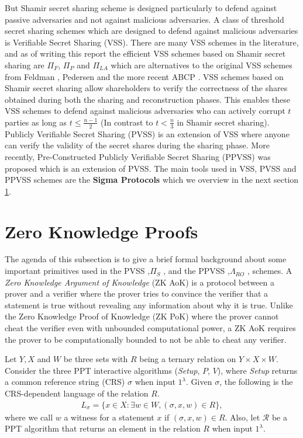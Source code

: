 But Shamir secret sharing scheme is designed particularly to defend against passive adversaries and not 
against malicious adversaries. A class of threshold secret sharing schemes which are designed to defend 
against malicious adversaries is Verifiable Secret Sharing (VSS). There are many VSS schemes in the literature, 
and as of writing this report the efficient VSS schemes based on Shamir secret sharing are $\Pi_F$, 
$\Pi_P$ and $\Pi_{LA}$ \cite{cryptoeprint:2023/1669} which are alternatives to the original VSS schemes 
from Feldman \cite{DBLP:conf/focs/Feldman87}, Pedersen \cite{crypto-1991-1671} and the more recent 
ABCP \cite{cryptoeprint:2023/992}. VSS schemes based on Shamir secret sharing allow shareholders to 
verify the correctness of the shares obtained during both the sharing and reconstruction phases. This enables 
these VSS schemes to defend against malicious adversaries who can actively corrupt $t$ parties as long as 
$t\leq\frac{n-1}{2}$ (In contrast to $t<\frac{n}{3}$ in Shamir secret sharing). Publicly Verifiable Secret Sharing (PVSS) is an extension of VSS where anyone can 
verify the validity of the secret shares during the sharing phase. More recently, Pre-Constructed Publicly 
Verifiable Secret Sharing (PPVSS)\cite{cryptoeprint:2025/576} was proposed which is an extension of PVSS. 
The main tools used in VSS, PVSS and PPVSS schemes are the \textbf{Sigma Protocols} which we overview in the 
next section \ref{sec:sigma-protocols}.

\section{Zero Knowledge Proofs}
\label{sec:sigma-protocols}
The agenda of this subsection is to give a brief formal background about some important primitives 
used in the PVSS ,$\Pi_S$ \cite{cryptoeprint:2023/1669}, and the PPVSS ,$\Lambda_{RO}$ \cite{cryptoeprint:2025/576}, schemes. 
A \textit{Zero Knowledge Argument of Knowledge} (ZK AoK)\cite{cryptoeprint:2017/1066} is a protocol between a prover and a verifier
where the prover tries to convince the verifier that a statement is true without revealing any information 
about why it is true. Unlike the Zero Knowledge Proof of Knowledge (ZK PoK) where the prover cannot cheat 
the verifier even with unbounded computational power, a ZK AoK requires the prover to be computationally bounded 
to not be able to cheat any verifier.\par
Let $Y,X$ and $W$ be three sets with $R$ being a ternary relation on $Y\times X\times W$. Consider the 
three PPT interactive algorithms (\textit{Setup}, $P$, $V$), where \textit{Setup} returns a 
common reference string (CRS) $\sigma$ when input $1^{\lambda}$. Given $\sigma$, the following 
is the CRS-dependent language of the relation $R$.
\begin{align*}
  L_{\sigma}=\{x\in X :\exists w\in W, (\sigma, x, w)\in R\},
\end{align*}
where we call $w$ a witness for a statement $x$ if $(\sigma, x, w)\in R$. Also, let $\mathcal{R}$ be 
a PPT algorithm that returns an element in the relation $R$ when input $1^{\lambda}$.\par

